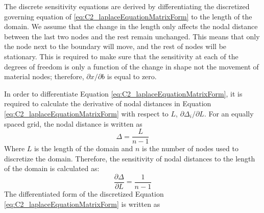 %
The discrete sensitivity equations are derived by differentiating the discretized governing equation of \eqref{eq:C2_laplaceEquationMatrixForm} to the length of the domain. We assume that the change in the length only affects the nodal distance between the last two nodes and the rest remain unchanged. This means that only the node next to the boundary will move, and the rest of nodes will be stationary. This is required to make sure that the sensitivity at each of the degrees of freedom is only a function of the change in shape not the movement of material nodes; therefore, $\partial x/\partial b$ is equal to zero.

In order to differentiate Equation  \eqref{eq:C2_laplaceEquationMatrixForm}, it is required to calculate the derivative of nodal distances in Equation \eqref{eq:C2_laplaceEquationMatrixForm} with respect to $L$, $\partial \Delta_i/\partial L$. For an equally spaced grid, the nodal distance is written as
%
\begin{equation*}
    \Delta = \frac{L}{n - 1}
\end{equation*}
%
Where $L$ is the length of the domain and $n$ is the number of nodes used to discretize the domain. Therefore, the sensitivity of nodal distances to the length of the domain is calculated as:
%
\begin{equation}\label{eq:C2_nodeDistanceSensitivity}
    \frac{\partial \Delta}{\partial L} = \frac{1}{n-1}
\end{equation}
%
The differentiated form of the discretized Equation \eqref{eq:C2_laplaceEquationMatrixForm} is written as
%
